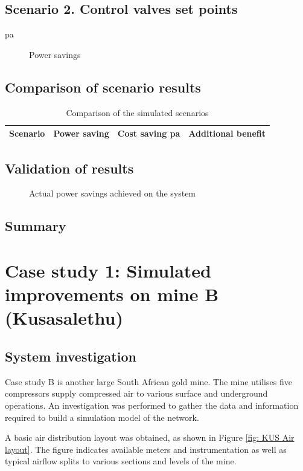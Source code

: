 \subsection{Scenario 2. Control valves set points}
\gls{pa}
\begin{figure}[h!]
	\centering
	
	\caption{Power savings}
	\label{fig: Control Valve Results Beatrix}
\end{figure}
\subsection{Comparison of scenario results}
\begin{table}[h]
	\centering
	\begin{tabular}{lccr}
		\hline 
		Scenario \hspace{2cm} & Power saving & Cost saving \gls{pa} & Additional benefit  \\

		\hline 
	\end{tabular}
	\caption{Comparison of the simulated scenarios}
	\label{Table: A Comparison}
\end{table}
\subsection{Validation of results}
\begin{figure}[h!]
	\centering
	
	\caption{Actual power savings achieved on the system}
	\label{fig: Actual permormance beet}
\end{figure}
\subsection{Summary}
\newpage
\section{Case study 1: Simulated improvements on mine B \tiny{\color{blue}(Kusasalethu)}}

	\subsection{System investigation}
	Case study B is another large South African gold mine. The mine utilises five compressors supply compressed air to various surface and underground operations. An investigation was performed to gather the data and information required to build a simulation model of the network.
	\par 
	A basic air distribution layout was obtained, as shown in Figure \ref{fig: KUS Air layout}.  The figure indicates available meters and instrumentation as well as typical airflow splits to various sections and levels of the mine.
	\par 


